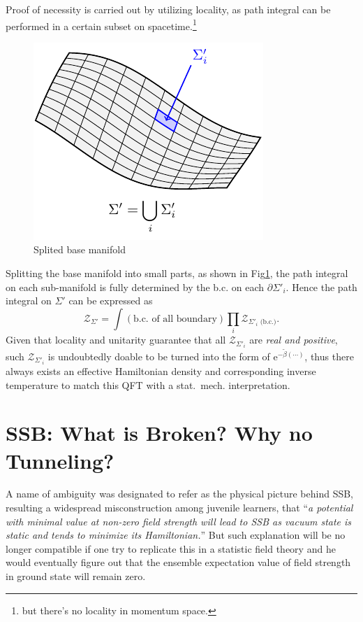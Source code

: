 Proof of necessity is carried out by utilizing locality, as path integral can be performed in a certain subset on spacetime.\footnote{but there's no locality in momentum space.}
\begin{figure}
    \centering
    \includegraphics{figures/splited_base_manifold.pdf}
    \caption{Splited base manifold}
    \label{split_manifold}
\end{figure}
Splitting the base manifold into small parts, as shown in Fig\ref{split_manifold}, the path integral on each sub-manifold is fully determined by the b.c. on each $\partial\Sigma'_{i}$. Hence the path integral on $\Sigma'$ can be expressed as
\begin{equation}
    \mathcal{Z}_{\Sigma'} = \int \left( \text{b.c. of all boundary} \right) \prod_{i} \mathcal{Z}_{\Sigma' _{i} \text{ (b.c.)}}.
\end{equation}
Given that locality and unitarity guarantee that all $\mathcal{Z}_{\Sigma'_{i}}$ are \emph{real and positive}, such $\mathcal{Z}_{\Sigma'_{i}}$ is undoubtedly doable to be turned into the form of $\mathrm{e}^{- \tilde{\beta} \left( \cdots \right) }$, thus there always exists an effective Hamiltonian density and corresponding inverse temperature to match this QFT with a stat.~mech. interpretation.


\section[When do Symmetries Break Spontaneously]{SSB: What is Broken? Why no Tunneling?}

A name of ambiguity was designated to refer as the physical picture behind SSB, resulting a widespread misconstruction among juvenile learners, that ``\emph{a potential with minimal value at non-zero field strength will lead to SSB as vacuum state is static and tends to minimize its Hamiltonian.}'' But such explanation will be no longer compatible if one try to replicate this in a statistic field theory and he would eventually figure out that the ensemble expectation value of field strength in ground state will remain zero. 